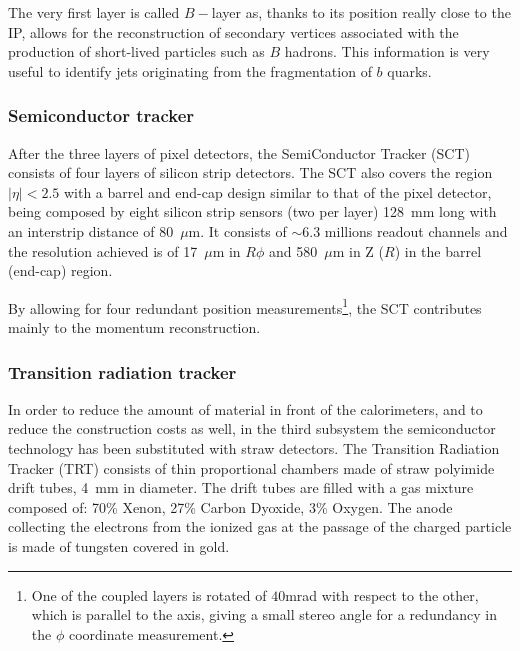 The very first layer is called $B-$layer as, thanks to its position really close to the IP,
allows for the reconstruction of secondary vertices associated with the production of
 short-lived particles such as $B$ hadrons. This information is very useful to identify
jets originating from the fragmentation of $b$ quarks.

\subsubsection{Semiconductor tracker}

After the three layers of pixel detectors, the SemiConductor
Tracker (SCT) consists of 
four layers of  silicon strip detectors. The SCT
 also covers the region $|\eta|<2.5$ with a barrel and end-cap design similar to that of the 
pixel detector, being composed by eight silicon strip sensors 
(two per layer) 128~mm long with an interstrip distance of 80~$\mu$m.
It consists of $\sim$6.3 millions readout channels and the resolution achieved is of 17~$\mu$m 
in $R\phi$  and 580~$\mu$m in Z ($R$) in the barrel (end-cap) region.

By allowing for four redundant position measurements\footnote{One of the coupled layers is rotated of $40$mrad with respect
to the other, which is parallel to the axis, giving a small stereo angle for a redundancy in the $\phi$ coordinate measurement.}, 
the SCT contributes mainly to the momentum reconstruction.


\subsubsection{Transition radiation tracker}

In order to reduce the amount of material in front of the calorimeters, and to reduce the construction costs as well,
in the third subsystem the semiconductor technology has been substituted with straw detectors.
The Transition Radiation Tracker (TRT) consists of thin proportional chambers made of straw polyimide drift tubes, 4~mm in diameter.
The drift tubes are filled with a gas mixture composed of: 70\% Xenon, 27\% Carbon Dyoxide, 3\% Oxygen. The anode 
collecting the electrons from the ionized gas at the passage of the charged particle is made of
tungsten covered in gold.

